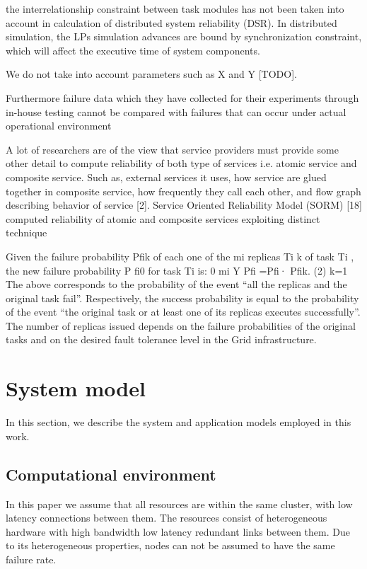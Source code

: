 \documentclass{cslthse-msc}
\begin{document}
the interrelationship constraint between task modules has not been taken into account in calculation of distributed system reliability (DSR). In distributed simulation, the LPs simulation advances are bound by synchronization constraint, which will affect the executive time of system components. \cite{relModelDistSimSystem}

We do not take into account parameters such as X and Y [TODO].

Furthermore failure data which they have collected for their experiments through in-house testing cannot be compared with failures that can occur under actual operational environment \cite{surveyReliabilityDistr}

A lot of researchers are of the view that service providers must provide some other detail to compute reliability of both type of services i.e. atomic service and composite service. Such as, external services it uses, how service are glued together in composite service, how frequently they call each other, and flow graph describing behavior of service [2]. Service Oriented Reliability Model (SORM) [18] computed reliability of atomic and composite services exploiting distinct technique \cite{surveyReliabilityDistr}

Given the failure probability Pfik of each one of the mi replicas Ti k of task Ti , the new failure probability P fi0 for task Ti is:
0 mi Y
Pfi =Pfi· Pfik. (2) k=1
The above corresponds to the probability of the event “all the replicas and the original task fail”. Respectively, the success probability is equal to the probability of the event “the original task or at least one of its replicas executes successfully”. The number of replicas issued depends on the failure probabilities of the original tasks and on the desired fault tolerance level in the Grid infrastructure. \cite{effTaskReplMobGrid}
\fi

\section{System model} \label{sec:design_system_model}
In this section, we describe the system and application models employed in this work.

\subsection{Computational environment} \label{subsec:design_comp_env}
In this paper we assume that all resources are within the same cluster, with low latency connections between them. The resources consist of heterogeneous hardware with high bandwidth low latency redundant links between them. Due to its heterogeneous properties, nodes can not be assumed to have the same failure rate.
\end{document}
